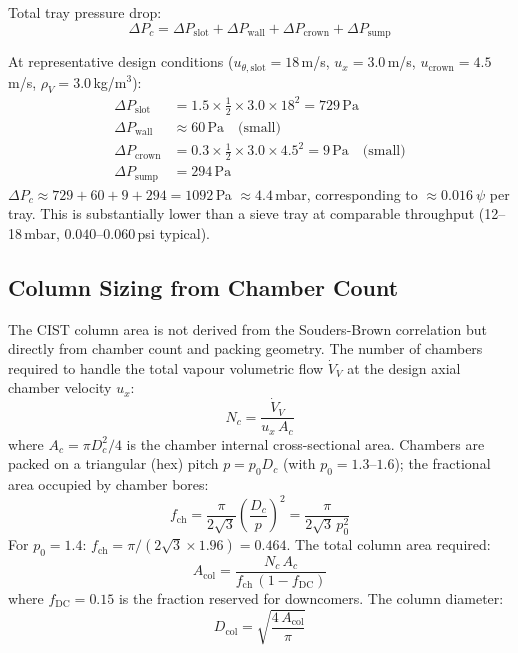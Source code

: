 \documentclass[11pt,letterpaper]{article}
\newcommand{\rhoV}{\rho_V}
\newcommand{\ux}{u_{x}}
\newcommand{\dpc}{\Delta P_c}
\newcommand{\Dc}{D_c}
\begin{document}
Total tray pressure drop:
\begin{equation}
  \dpc = \Delta P_{\mathrm{slot}} + \Delta P_{\mathrm{wall}}
        + \Delta P_{\mathrm{crown}} + \Delta P_{\mathrm{sump}}
  \label{eq:dpc}
\end{equation}

At representative design conditions
($u_{\theta,\mathrm{slot}} = 18$\,m/s, $\ux = 3.0$\,m/s,
$u_{\mathrm{crown}} = 4.5$\,m/s, $\rhoV = 3.0$\,kg/m$^3$):
\begin{align*}
  \Delta P_{\mathrm{slot}}  &= 1.5\times\tfrac{1}{2}\times 3.0\times 18^2
                              = 729\,\mathrm{Pa}\\
  \Delta P_{\mathrm{wall}}  &\approx 60\,\mathrm{Pa}\quad\text{(small)}\\
  \Delta P_{\mathrm{crown}} &= 0.3\times\tfrac{1}{2}\times 3.0\times 4.5^2
                              = 9\,\mathrm{Pa}\quad\text{(small)}\\
  \Delta P_{\mathrm{sump}}  &= 294\,\mathrm{Pa}
\end{align*}
$\dpc \approx 729 + 60 + 9 + 294 = 1092$\,Pa $\approx 4.4$\,mbar,
corresponding to $\approx\SI{0.016}{\psi}$ per tray.  This is
substantially lower than a sieve tray at comparable throughput
(12--18\,mbar, $0.040$--$0.060$\,psi typical).

\subsection{Column Sizing from Chamber Count}
\label{sec:sizing}

The CIST column area is not derived from the Souders-Brown correlation but
directly from chamber count and packing geometry.  The number of chambers
required to handle the total vapour volumetric flow $\dot{V}_V$ at the
design axial chamber velocity $\ux$:
\begin{equation}
  N_c = \frac{\dot{V}_V}{\ux\,A_c}
  \label{eq:nc}
\end{equation}
where $A_c = \pi\Dc^2/4$ is the chamber internal cross-sectional area.
Chambers are packed on a triangular (hex) pitch $p = p_0\Dc$ (with $p_0
= 1.3$--$1.6$); the fractional area occupied by chamber bores:
\begin{equation}
  f_{\mathrm{ch}} = \frac{\pi}{2\sqrt{3}}\left(\frac{\Dc}{p}\right)^2
                  = \frac{\pi}{2\sqrt{3}\,p_0^2}
  \label{eq:fch}
\end{equation}
For $p_0 = 1.4$: $f_{\mathrm{ch}} = \pi/(2\sqrt{3}\times1.96) = 0.464$.
The total column area required:
\begin{equation}
  A_{\mathrm{col}} = \frac{N_c\,A_c}{f_{\mathrm{ch}}\,(1-f_{\mathrm{DC}})}
  \label{eq:acol}
\end{equation}
where $f_{\mathrm{DC}} = 0.15$ is the fraction reserved for downcomers.
The column diameter:
\begin{equation}
  D_{\mathrm{col}} = \sqrt{\frac{4\,A_{\mathrm{col}}}{\pi}}
  \label{eq:dcol}
\end{equation}
\end{document}
